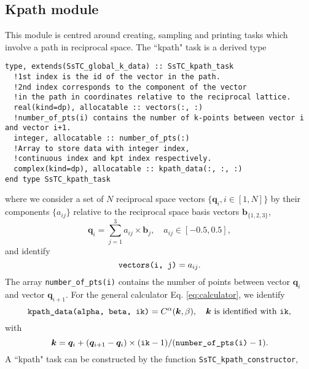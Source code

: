\documentclass[10pt,a4paper]{article}
\begin{document}
\subsection{Kpath module}
This module is centred around creating, sampling and printing tasks which involve a path in reciprocal space. The ``kpath" task is a derived type
\begin{lstlisting}[caption={Derived type corresponding to a ``kpath" task.},captionpos=b]
type, extends(SsTC_global_k_data) :: SsTC_kpath_task
  !1st index is the id of the vector in the path.
  !2nd index corresponds to the component of the vector
  !in the path in coordinates relative to the reciprocal lattice.
  real(kind=dp), allocatable :: vectors(:, :)
  !number_of_pts(i) contains the number of k-points between vector i and vector i+1.
  integer, allocatable :: number_of_pts(:)
  !Array to store data with integer index,
  !continuous index and kpt index respectively.
  complex(kind=dp), allocatable :: kpath_data(:, :, :)
end type SsTC_kpath_task
\end{lstlisting}
where we consider a set of $N$ reciprocal space vectors $\{\bm{q}_i, i\in[1, N]\}$ by their components $\{a_{ij}\}$ relative to the reciprocal space basis vectors $\bm{b}_{\{1, 2, 3\}}$,
\begin{equation}\label{eq:vec_coords_path}
\bm{q}_i = \sum_{j=1}^3 a_{ij}\times \bm{b}_j, \quad a_{ij}\in\left[-0.5, 0.5\right],
\end{equation}
and identify
\begin{equation}
\verb|vectors(i, j)| = a_{ij}.
\end{equation}
The array \verb|number_of_pts(i)| contains the number of points between vector $\bm{q}_i$ and vector $\bm{q}_{i+1}$. For the general calculator Eq. \eqref{eq:calculator}, we identify
\begin{equation}
\verb|kpath_data(alpha, beta, ik)| = C^{\alpha}(\bm{k},\beta),\quad \bm{k}\text{ is identified with } \verb|ik|,
\end{equation}
with
\begin{equation}
\bm{k} = \bm{q}_i + (\bm{q}_{i+1} - \bm{q}_i)\times (\verb|ik| - 1)/(\verb|number_of_pts(i)| - 1).
\end{equation}
A ``kpath" task can be constructed by the function \verb|SsTC_kpath_constructor|,
\end{document}
